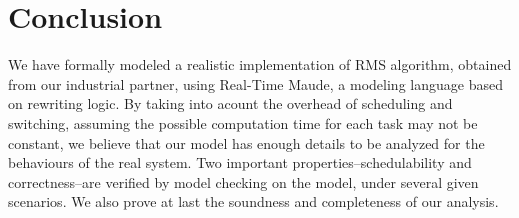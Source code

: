 \documentclass{llncs}
\begin{document}
\section{Conclusion}
\label{s:conclusion}
We have formally modeled a realistic implementation of RMS algorithm,
obtained from our industrial partner, using Real-Time Maude, a
modeling language based on rewriting logic. By taking into acount the
overhead of scheduling and switching, assuming the possible
computation time for each task may not be constant, we believe that
our model has enough details to be analyzed for the behaviours of the
real system. Two important properties--schedulability and
correctness--are verified by model checking on the model, under
several given scenarios. We also prove at last the soundness and
completeness of our analysis.


 
\end{document}

